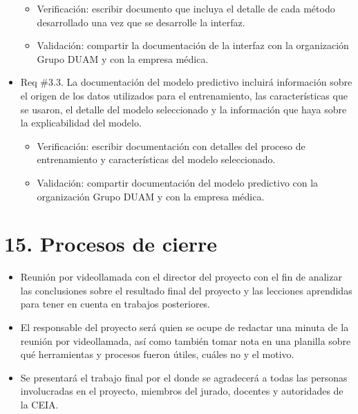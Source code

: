 \documentclass[
11pt, %
]{charter}
\begin{document}
\begin{itemize}
	\begin{itemize}
		\item Verificación: escribir documento que incluya el detalle de cada método desarrollado una vez que se desarrolle la interfaz.
		\item Validación: compartir la documentación de la interfaz con la organización Grupo DUAM y con la empresa médica.
	\end{itemize}
	\item Req \#3.3. La documentación del modelo predictivo incluirá información sobre el origen de los datos utilizados para el entrenamiento, las características que se usaron, el detalle del modelo seleccionado y la información que haya sobre la explicabilidad del modelo.
	\begin{itemize}
		\item Verificación: escribir documentación con detalles del proceso de entrenamiento y características del modelo seleccionado.
		\item Validación: compartir documentación del modelo predictivo con la organización Grupo DUAM y con la empresa médica.
	\end{itemize}
\end{itemize}

\section{15. Procesos de cierre}    
\label{sec:cierre}

\begin{itemize}
	\item Reunión por videollamada con el director del proyecto con el fin de analizar las conclusiones sobre el resultado final del proyecto y las lecciones aprendidas para tener en cuenta en trabajos posteriores.
	\item El responsable del proyecto será quien se ocupe de redactar una minuta de la reunión por videollamada, así como también tomar nota en una planilla sobre qué herramientas y procesos fueron útiles, cuáles no y el motivo.
	\item Se presentará el trabajo final por el \authorname\hspace{1px} donde se agradecerá a todas las personas involucradas en el proyecto, miembros del jurado, docentes y autoridades de la CEIA.
\end{itemize}
\end{document}
